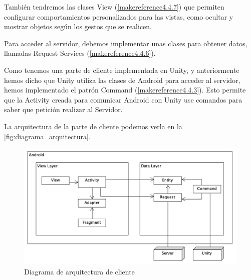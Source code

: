 También tendremos las clases View (\autoref{makereference4.4.7}) que permiten configurar comportamientos personalizados para las vistas,
como ocultar y mostrar objetos según los gestos que se realicen.

Para acceder al servidor, debemos implementar unas clases para obtener datos, llamadas Request Services (\autoref{makereference4.4.6}).

Como tenemos una parte de cliente implementada en Unity, y anteriormente hemos dicho que Unity utiliza las clases de Android para acceder al servidor,
hemos implementado el patrón Command (\autoref{makereference4.4.3}). Esto permite que 
la Activity creada para comunicar Android con Unity use comandos para saber que petición realizar al Servidor.

La arquitectura de la parte de cliente podemos verla en la \autoref{fig:diagrama_arquitectura}.
\begin{figure}[H]
    \centering
    \includegraphics[width=6in]{figures/chapter-4/diagrama_cliente.png}
    \caption{Diagrama de arquitectura de cliente}
    \label{fig:diagrama_arquitectura}
\end{figure}



